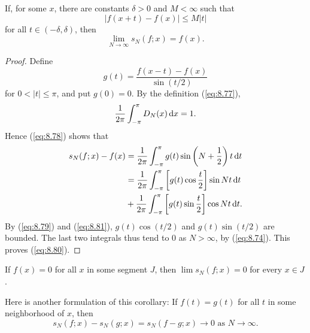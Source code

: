 \begin{thm}
    \label{thm:8.14}
    If, for some $x$, there are constants $\delta > 0$ and $M < \infty $ such that 
    \begin{equation}
        \label{eq:8.79}
        \left| f(x+t)-f(x) \right| \leq M \left| t \right| 
    \end{equation}
    for all $t \in (-\delta,\delta)$, then 
    \begin{equation}
        \label{eq:8.80}
        \lim_{N \to \infty} s_N(f;x) = f(x).
    \end{equation}
\end{thm}

\begin{proof}
    Define 
    \begin{equation}
        \label{eq:8.81}
        g(t) = \frac{f(x-t)-f(x)}{\sin(t/2)}
    \end{equation}
    for $0<|t|\leq \pi$, and put $g(0)=0$.
    By the definition (\ref{eq:8.77}),
    \begin{equation*}
        \frac{1}{2\pi} \int_{-\pi}^{\pi} D_N(x) \d x = 1.
    \end{equation*}
    Hence (\ref{eq:8.78}) shows that 
    \begin{align*}
        s_N(f;x)-f(x)
        &= \frac{1}{2\pi} \int_{-\pi}^{\pi} g(t) \sin \left( N+\frac{1}{2} \right) t \d t \\
        &= \frac{1}{2\pi} \int_{-\pi}^{\pi} \left[ g(t)\cos \frac{t}{2} \right] \sin N t \d t \\
        &+ \frac{1}{2\pi} \int_{-\pi}^{\pi} \left[ g(t)\sin \frac{t}{2} \right] \cos N t \d t .
    \end{align*}
    By (\ref{eq:8.79}) and (\ref{eq:8.81}), $g(t) \cos (t/2)$ and $g(t) \sin (t/2)$ are bounded. 
    The last two integrals thus tend to $0$ as $N > \infty$, by (\ref{eq:8.74}). 
    This proves (\ref{eq:8.80}).
\end{proof}


\begin{myCorollary*}
    If $f(x) = 0$ for all $x$ in some segment $J$, 
    then $\lim s_N(f; x) = 0$ for every $x \in J$.
\end{myCorollary*}

Here is another formulation of this corollary:
If $f (t) = g(t)$ for all $t$ in some neighborhood of $x$, then
\begin{equation*}
    s_N(f; x) - s_N(g; x) = s_N(f - g ; x) \rightarrow 0 
    \text{ as }
    N \rightarrow \infty .
\end{equation*}

